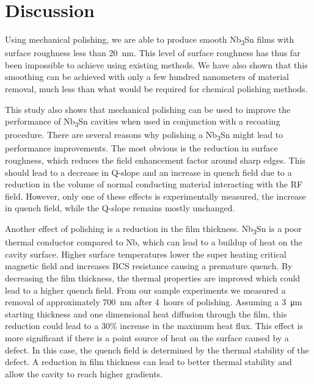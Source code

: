 %
\section{Discussion}%
\label{sec:Discussion}%
Using mechanical polishing, we are able to produce smooth Nb\textsubscript{3}Sn films with surface roughness less than 20~nm. This level of surface roughness has thus far been impossible to achieve using existing methods.\cite{posen2021advances,pudasaini2018studies,pudasaini2017post,hu2019reducing} We have also shown that this smoothing can be achieved with only a few hundred nanometers of material removal, much less than what would be required for chemical polishing methods.

This study also shows that mechanical polishing can be used to improve the performance of Nb\textsubscript{3}Sn cavities when used in conjunction with a recoating procedure. There are several reasons why polishing a Nb\textsubscript{3}Sn might lead to performance improvements. The most obvious is the reduction in surface roughness, which reduces the field enhancement factor around sharp edges. This should lead to a decrease in Q-slope and an increase in quench field\cite{knobloch1999high, xu2016simulation} due to a reduction in the volume of normal conducting material interacting with the RF field. However, only one of these effects is experimentally measured, the increase in quench field, while the Q-slope remains mostly unchanged.

Another effect of polishing is a reduction in the film thickness. Nb\textsubscript{3}Sn is a poor thermal conductor compared to Nb, which can lead to a buildup of heat on the cavity surface. Higher surface temperatures lower the super heating critical magnetic field and increases BCS resistance causing a premature quench. By decreasing the film thickness, the thermal properties are improved which could lead to a higher quench field\cite{kulyavtsev2021simulations}. From our sample experiments we measured a removal of approximately 700~nm after 4~hours of polishing. Assuming a 3~\unit{\micro\metre} starting thickness and one dimensional heat diffusion through the film, this reduction could lead to a 30\% increase in the maximum heat flux. This effect is more significant if there is a point source of heat on the surface caused by a defect\cite{porter2021advancing}. In this case, the quench field is determined by the thermal stability of the defect. A reduction in film thickness can lead to better thermal stability and allow the cavity to reach higher gradients.

